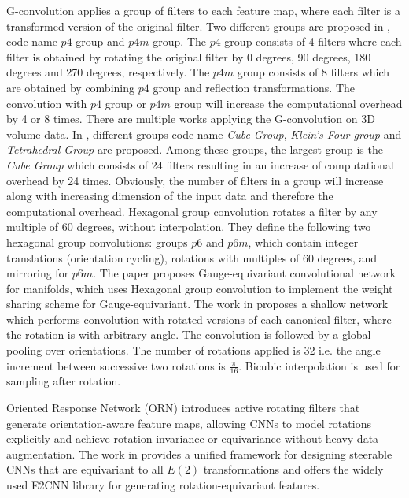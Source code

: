 G-convolution \cite{G} applies a group of filters to each feature map, where each filter is a transformed version of the original filter. Two different groups are proposed in \cite{G}, code-name $p4$ group and $p4m$ group. The $p4$ group consists of 4 filters where each filter is obtained by rotating the original filter by 0 degrees, 90 degrees, 180 degrees and 270 degrees, respectively. The $p4m$ group consists of 8 filters which are obtained by combining $p4$ group and reflection transformations. The convolution with $p4$ group or $p4m$ group will increase the computational overhead by 4 or 8 times. 
There are multiple works \cite{CubeNet1, CubeNet2} applying the G-convolution on 3D volume data. In \cite{CubeNet1}, different groups code-name \textit{Cube Group}, \textit{Klein's Four-group} and \textit{Tetrahedral Group} are proposed. Among these groups, the largest group is the \textit{Cube Group} which consists of 24 filters resulting in an increase of computational overhead by 24 times. Obviously, the number of filters in a group will increase along with increasing dimension of the input data and therefore the computational overhead. 
Hexagonal group convolution \cite{hexa} rotates a filter by any multiple of 60 degrees, without interpolation. They define the following two hexagonal group convolutions: groups $p6$ and $p6m$, which contain integer translations (orientation cycling), rotations with multiples of 60 degrees, and mirroring for $p6m$. The paper \cite{G-cnn10} proposes Gauge-equivariant convolutional network for manifolds, which uses Hexagonal group convolution to implement the weight sharing scheme for Gauge-equivariant. 
The work in \cite{shallowNet}
proposes a shallow network which
performs convolution with rotated versions
of each canonical filter, where the rotation is with arbitrary angle.
The convolution is followed by a global pooling over orientations.
The number of rotations applied is 32 i.e. the angle increment between 
successive two rotations is $\frac{\pi}{16}$.
Bicubic interpolation is used for sampling after rotation.


Oriented Response Network (ORN) \cite{orn} introduces active rotating filters that generate orientation-aware feature maps, allowing CNNs to model rotations explicitly and achieve rotation invariance or equivariance without heavy data augmentation.
The work in \cite{e2cnn} provides a unified framework for designing steerable CNNs that are equivariant to all
$E(2)$ transformations and offers the widely used E2CNN library for generating rotation-equivariant features.


